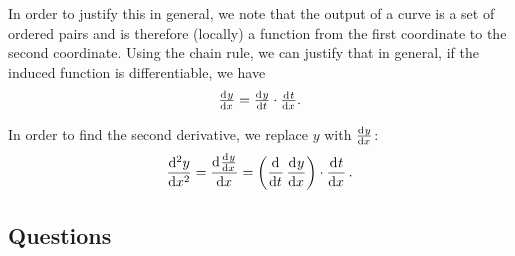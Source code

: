 In order to justify this in general, we note that the output of a curve is a set of ordered pairs and is therefore (locally) a function from the
first coordinate to the second coordinate. Using the chain rule, we can justify that in general, if the induced function is differentiable, we have
\begin{displaymath}
  \od{y}{x} = \od{y}{t} \cdot \od{t}{x}.
\end{displaymath}

In order to find the second derivative, we replace $ y $ with $ \od{y}{x} $:
\begin{displaymath}
  \dod[2]{y}{x} = \dod{\od{y}{x}}{x} = \left(\dod{}{t} \dod{y}{x}\right) \cdot \dod{t}{x}.
\end{displaymath}

\clearpage
\subsection*{Questions}
